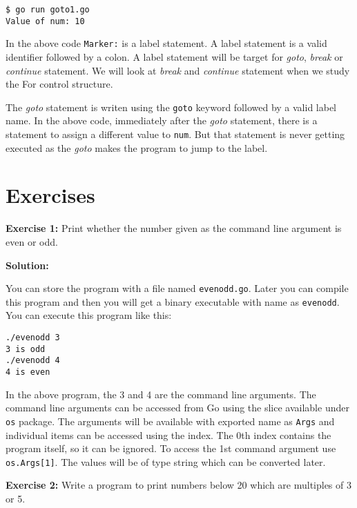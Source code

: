 \begin{lstlisting}[caption=Goto example program output]
$ go run goto1.go
Value of num: 10
\end{lstlisting}

In the above code \texttt{Marker:} is a label statement.  A label
statement is a valid identifier followed by a colon.  A label
statement will be target for \textit{goto}, \textit{break}
or \textit{continue} statement.  We will look at \textit{break}
and \textit{continue} statement when we study the For control
structure.

The \textit{goto} statement is writen using the \texttt{goto} keyword
followed by a valid label name.  In the above code, immediately after
the \textit{goto} statement, there is a statement to assign a
different value to \texttt{num}.  But that statement is never getting
executed as the \textit{goto} makes the program to jump to the label.

\section{Exercises}

\textbf{Exercise 1:} Print whether the number given as the command line
argument is even or odd.

\textbf{Solution:}

You can store the program with a file named \texttt{evenodd.go}.
Later you can compile this program and then you will get a binary
executable with name as \texttt{evenodd}.  You can execute this
program like this:

\begin{lstlisting}[numbers=none]
./evenodd 3
3 is odd
./evenodd 4
4 is even
\end{lstlisting}

In the above program, the 3 and 4 are the command line arguments.  The
command line arguments can be accessed from Go using the slice
available under \texttt{os} package.  The arguments will be available
with exported name as \texttt{Args} and individual items can be
accessed using the index.  The 0th index contains the program itself,
so it can be ignored.  To access the 1st command argument
use \texttt{os.Args[1]}.  The values will be of type string which can
be converted later.



\textbf{Exercise 2:} Write a program to print numbers below 20 which are multiples of 3 or 5.

